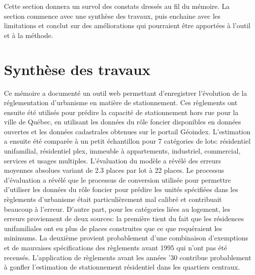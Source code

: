 \label{sec:Conclusion}
Cette section donnera un survol des constats dressés au fil du mémoire. La section commence avec une synthèse des travaux, puis enchaine avec les limitations et conclut sur des améliorations qui pourraient être apportées à l'outil et à la méthode.

\section{Synthèse des travaux}
    Ce mémoire a documenté un outil web permettant d'enregistrer l'évolution de la réglementation d'urbanisme en matière de stationnement. Ces règlements ont ensuite été utilisés pour prédire la capacité de stationnement hors rue pour la ville de Québec, en utilisant les données du rôle foncier disponibles en données ouvertes et les données cadastrales obtenues sur le portail Géoindex. L'estimation a ensuite été comparée à un petit échantillon pour 7 catégories de lots: résidentiel unifamilial, résidentiel plex, immeuble à appartements, industriel, commercial, services et usages multiples. L'évaluation du modèle a révélé des erreurs moyennes absolues variant de 2.3 places par lot à 22 places. Le processus d'évaluation a révélé que le processus de conversion utilisée pour permettre d'utiliser les données du rôle foncier pour prédire les unités spécifiées dans les règlements d'urbanisme était particulièrement mal calibré et contribuait beaucoup à l'erreur. D'autre part, pour les catégories liées au logement, les erreurs proviennent de deux sources: la première tient du fait que les résidences unifamiliales ont eu plus de places construites que ce que requéraient les minimums. La deuxième provient probablement d'une combinaison d'exemptions et de mauvaises spécifications des règlements avant 1995 qui n'ont pas été recensés. L'application de règlements avant les années '30 contribue probablement à gonfler l'estimation de stationnement résidentiel dans les quartiers centraux. \par 

